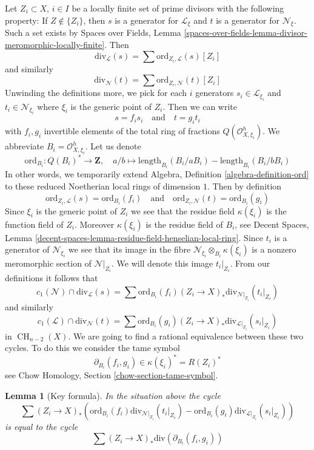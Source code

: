 \documentclass{stacks-project}
\theoremstyle{plain}
\newtheorem{lemma}[subsection]{Lemma}
\theoremstyle{definition}
\theoremstyle{remark}
\numberwithin{equation}{subsection}
\def\CH{\mathop{\mathrm{CH}}\nolimits}
\begin{document}
\medskip\noindent
Let $Z_i \subset X$, $i \in I$ be a locally finite set of prime divisors
with the following property: If $Z \not \in \{Z_i\}$, then $s$ is a
generator for $\mathcal{L}_\xi$ and $t$ is a generator for $\mathcal{N}_\xi$.
Such a set exists by Spaces over Fields, Lemma
\ref{spaces-over-fields-lemma-divisor-meromorphic-locally-finite}.
Then
$$
\text{div}_\mathcal{L}(s) = \sum \text{ord}_{Z_i, \mathcal{L}}(s) [Z_i]
$$
and similarly
$$
\text{div}_\mathcal{N}(t) = \sum \text{ord}_{Z_i, \mathcal{N}}(t) [Z_i]
$$
Unwinding the definitions more, we pick for each $i$ generators
$s_i \in \mathcal{L}_{\xi_i}$ and $t_i \in \mathcal{N}_{\xi_i}$
where $\xi_i$ is the generic point of $Z_i$. Then we can write
$$
s = f_i s_i
\quad\text{and}\quad
t = g_i t_i
$$
with $f_i, g_i$ invertible elements of the total ring of fractions
$Q(\mathcal{O}_{X, \xi_i}^h)$. We abbreviate $B_i = \mathcal{O}_{X, \xi_i}^h$.
Let us denote
$$
\text{ord}_{B_i} : Q(B_i)^* \longrightarrow \mathbf{Z},\quad
a/b \longmapsto
\text{length}_{B_i}(B_i/aB_i) - \text{length}_{B_i}(B_i/bB_i)
$$
In other words, we temporarily extend
Algebra, Definition \ref{algebra-definition-ord}
to these reduced Noetherian local rings of dimension $1$.
Then by definition
$$
\text{ord}_{Z_i, \mathcal{L}}(s) = \text{ord}_{B_i}(f_i)
\quad\text{and}\quad
\text{ord}_{Z_i, \mathcal{N}}(t) = \text{ord}_{B_i}(g_i)
$$
Since $\xi_i$ is the generic point of $Z_i$ we see that
the residue field $\kappa(\xi_i)$ is the function field of $Z_i$.
Moreover $\kappa(\xi_i)$ is the residue field of $B_i$, see
Decent Spaces, Lemma
\ref{decent-spaces-lemma-residue-field-henselian-local-ring}.
Since $t_i$ is a generator of $\mathcal{N}_{\xi_i}$ we see that
its image in the fibre $\mathcal{N}_{\xi_i} \otimes_{B_i} \kappa(\xi_i)$
is a nonzero meromorphic section of $\mathcal{N}|_{Z_i}$. We will denote
this image $t_i|_{Z_i}$. From our definitions it follows that
$$
c_1(\mathcal{N}) \cap \text{div}_\mathcal{L}(s) =
\sum \text{ord}_{B_i}(f_i)
(Z_i \to X)_*\text{div}_{\mathcal{N}|_{Z_i}}(t_i|_{Z_i})
$$
and similarly
$$
c_1(\mathcal{L}) \cap \text{div}_\mathcal{N}(t) =
\sum \text{ord}_{B_i}(g_i)
(Z_i \to X)_*\text{div}_{\mathcal{L}|_{Z_i}}(s_i|_{Z_i})
$$
in $\CH_{n - 2}(X)$. We are going to find a rational equivalence between
these two cycles. To do this we consider the tame symbol
$$
\partial_{B_i}(f_i, g_i) \in \kappa(\xi_i)^* = R(Z_i)^*
$$
see Chow Homology, Section \ref{chow-section-tame-symbol}.

\begin{lemma}[Key formula]
\label{lemma-key-formula}
In the situation above the cycle
$$
\sum
(Z_i \to X)_*\left(
\text{ord}_{B_i}(f_i) \text{div}_{\mathcal{N}|_{Z_i}}(t_i|_{Z_i}) -
\text{ord}_{B_i}(g_i) \text{div}_{\mathcal{L}|_{Z_i}}(s_i|_{Z_i}) \right)
$$
is equal to the cycle
$$
\sum (Z_i \to X)_*\text{div}(\partial_{B_i}(f_i, g_i))
$$
\end{lemma}
\end{document}
